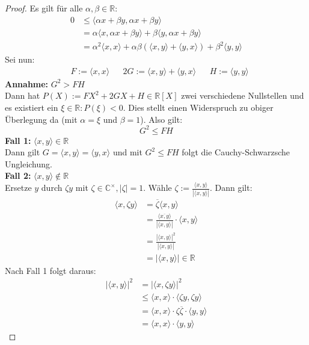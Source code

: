 \documentclass[parskip,a4paper,twoside,DIV15,BCOR12mm]{scrbook}
\begin{document}
\begin{proof}
Es gilt für alle $\alpha,\beta\in\mathbb{R}$:
\begin{align*}
0&\le \langle\alpha x+\beta y,\alpha x+\beta y\rangle\\
&=\alpha\langle x,\alpha x+\beta y\rangle+\beta\langle y,\alpha x+\beta y\rangle\\
&= \alpha^2\langle x,x\rangle +\alpha\beta(\langle x,y\rangle+\langle y,x\rangle)+
\beta^2\langle y,y\rangle
\end{align*}
Sei nun:
\begin{align*}
&F:=\langle x,x\rangle& &2G:=\langle x,y\rangle+\langle y,x\rangle& &H:=\langle y,y\rangle
\end{align*}
\textbf{Annahme:} $G^2>FH$\\
Dann hat $P(X):=FX^2+2GX+H\in\mathbb{R}[X]$ zwei verschiedene Nullstellen und es
existiert ein $\xi\in\mathbb{R}:P(\xi)<0$. Dies stellt einen Widerspruch zu obiger Überlegung da
(mit $\alpha=\xi$ und $\beta=1$). Also gilt:
\[G^2\le FH\]
\textbf{Fall 1:} $\langle x,y\rangle \in\mathbb{R}$\\
Dann gilt $G=\langle x,y\rangle=\langle y,x\rangle$ und mit $G^2\le FH$ folgt
die Cauchy-Schwarzsche Ungleichung.\\
\textbf{Fall 2:} $\langle x,y\rangle \notin\mathbb{R}$\\
Ersetze $y$ durch $\zeta	 y$ mit $\zeta\in\mathbb{C}^\times,|\zeta|=1$.
Wähle $\zeta:=\frac{\langle x,y\rangle}{|\langle x,y\rangle|}$. Dann gilt:
\begin{align*}
\langle x,\zeta y\rangle &= \overline{\zeta}\langle x,y\rangle\\
&=\frac{\langle\overline{x,y}\rangle}{|\langle x,y \rangle |}\cdot \langle  x,y\rangle\\
&=\frac{|\langle x,y \rangle |^2}{|\langle x,y \rangle |}\\
&=|\langle x,y \rangle |\in\mathbb{R}
\end{align*}
Nach Fall 1 folgt daraus:
\begin{align*}
|\langle x,y \rangle |^2&=|\langle x,\zeta y \rangle |^2\\
&\le \langle x,x\rangle\cdot\langle\zeta y,\zeta y\rangle\\
&=\langle x,x\rangle\cdot \zeta\overline\zeta\cdot\langle y,y\rangle\\
&=\langle x,x\rangle\cdot \langle y,y\rangle
\end{align*}
\end{proof}
\end{document}
